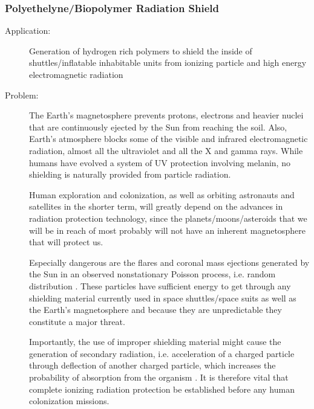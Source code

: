 \subsubsection{Polyethelyne/Biopolymer Radiation Shield} 
\label{biopolymer}
\begin{description}  \item[Application:] Generation of hydrogen rich polymers to shield the  inside of shuttles/inflatable inhabitable units from ionizing particle  and high energy electromagnetic radiation
\item[Problem:] 
The Earth’s magnetosphere prevents  protons, electrons and heavier nuclei that are continuously ejected by  the Sun from reaching the soil. Also, Earth's atmosphere blocks some of  the visible and infrared electromagnetic radiation, almost all the  ultraviolet and all the X and gamma rays. While humans have evolved a  system of UV protection involving melanin, no shielding is naturally  provided from particle radiation.

Human  exploration and colonization, as well as orbiting astronauts and  satellites in the shorter term, will greatly depend on the advances in  radiation protection technology, since the planets/moons/asteroids that  we will be in reach of most probably will not have an inherent  magnetosphere that will protect us.

Especially dangerous are the flares and coronal mass ejections generated by the  Sun in an observed nonstationary Poisson process, i.e. random  distribution \cite{Aschwanden2010}. These particles have  sufficient energy to get through any shielding material currently used  in space shuttles/space suits as well as the Earth's magnetosphere and because they are  unpredictable they constitute a major threat. \cite{solarsystemexplore}

Importantly,  the use of improper shielding material might cause the generation of  secondary radiation, i.e. acceleration of a charged particle through  deflection of another charged particle, which increases the probability  of absorption from the organism \cite{NCRP}.
It is therefore vital that  complete ionizing radiation protection be established before any human  colonization missions. 
 

\end{description}

